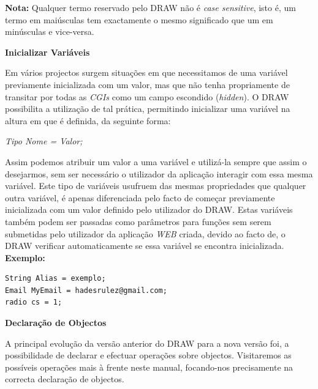 \documentclass[a4paper]{article}
\begin{document}
\vspace{.2cm}
\textbf{Nota:} Qualquer termo reservado pelo DRAW não é \emph{case sensitive}, isto é, um termo em maiúsculas tem exactamente o mesmo
significado que um em minúsculas e vice-versa.\\

\begin{normalsize}
\textbf{Inicializar Variáveis}\\
\end{normalsize}

\hspace{1cm}Em vários projectos surgem situações em que necessitamos de uma variável previamente inicializada com um valor, mas que não
tenha propriamente de transitar por todas as \emph{CGIs} como um campo escondido (\emph{hidden}). O DRAW possibilita a utilização de tal
prática, permitindo inicializar uma variável na altura em que é definida, da seguinte forma:

\begin{center}
\emph{Tipo Nome = Valor;}
\end{center}

Assim podemos atribuir um valor a uma variável e utilizá-la sempre que assim o desejarmos, sem ser necessário o utilizador da aplicação
interagir com essa mesma variável. Este tipo de variáveis usufruem das mesmas propriedades que qualquer outra variável, é apenas
diferenciada pelo facto de começar previamente inicializada com um valor definido pelo utilizador do DRAW. Estas variáveis também podem
ser passadas como parâmetros para funções sem serem submetidas pelo utilizador da aplicação \emph{WEB} criada, devido ao facto de, o DRAW
verificar automaticamente se essa variável se encontra inicializada.\\

\textbf{Exemplo:}

\begin{small}
\begin{lstlisting}
String Alias = exemplo;
Email MyEmail = hadesrulez@gmail.com;
radio cs = 1;
\end{lstlisting}
\end{small}

\vspace{.2cm}
\begin{normalsize}
\textbf{Declaração de Objectos}\\
\end{normalsize}

\hspace{1cm}A principal evolução da versão anterior do DRAW para a nova versão foi, a possibilidade de declarar e efectuar operações
sobre objectos. Visitaremos as possíveis operações mais à frente neste manual, focando-nos precisamente na correcta declaração de
objectos.
\end{document}
